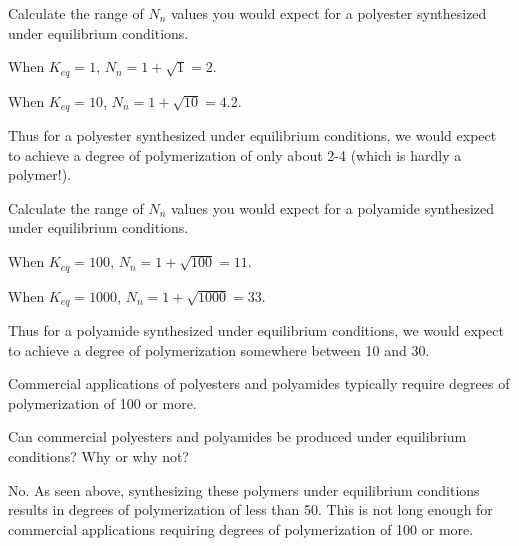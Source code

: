 \begin{activity}
\begin{ctqs}
		\question Calculate the range of $N_n$ values you would expect for a polyester synthesized under equilibrium conditions.
		
			\begin{solution}[2in]
			
				When $K_{eq}=1$, $N_n = 1+ \sqrt{1} = 2$.
			
				When $K_{eq}=10$, $N_n = 1+ \sqrt{10} = 4.2$.
				
				Thus for a polyester synthesized under equilibrium conditions, we would expect to achieve a degree of polymerization of only about 2-4 (which is hardly a polymer!).			
			
			\end{solution}
		
		\question Calculate the range of $N_n$ values you would expect for a polyamide synthesized under equilibrium conditions.
		
			\begin{solution}[2in]
			
				When $K_{eq}=100$, $N_n = 1+ \sqrt{100} = 11$.
			
				When $K_{eq}=1000$, $N_n = 1+ \sqrt{1000} = 33$.
				
				Thus for a polyamide synthesized under equilibrium conditions, we would expect to achieve a degree of polymerization somewhere between 10 and 30.
			\end{solution}
		
\end{ctqs}

\begin{infobox}

	Commercial applications of polyesters and polyamides typically require degrees of polymerization of 100 or more.  

\end{infobox}

\begin{ctqs}
		
		\question Can commercial polyesters and polyamides be produced under equilibrium conditions?  Why or why not?
		
			\begin{solution}[2in]
			
				No. As seen above, synthesizing these polymers under equilibrium conditions results in degrees of polymerization of less than 50.  This is not long enough for commercial applications requiring degrees of polymerization of 100 or more.
			

\end{solution}
\end{ctqs}
\end{activity}
